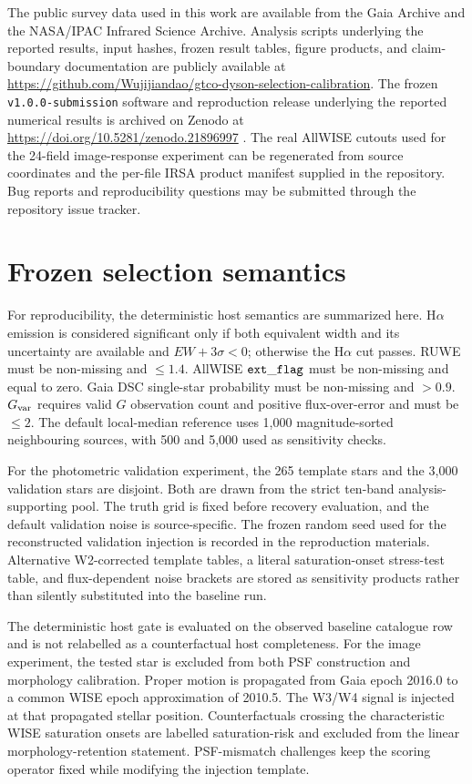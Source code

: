 \documentclass[fleqn,usenatbib]{mnras}
\begin{document}
The public survey data used in this work are available from the Gaia Archive and the NASA/IPAC Infrared Science Archive. Analysis scripts underlying the reported results, input hashes, frozen result tables, figure products, and claim-boundary documentation are publicly available at \url{https://github.com/Wujijiandao/gtco-dyson-selection-calibration}. The frozen \texttt{v1.0.0-submission} software and reproduction release underlying the reported numerical results is archived on Zenodo at \url{https://doi.org/10.5281/zenodo.21896997} \citep{Zhang2026GTCO}. The real AllWISE cutouts used for the 24-field image-response experiment can be regenerated from source coordinates and the per-file IRSA product manifest supplied in the repository. Bug reports and reproducibility questions may be submitted through the repository issue tracker.




\appendix

\section{Frozen selection semantics}
\label{app:semantics}

For reproducibility, the deterministic host semantics are summarized here. H$\alpha$ emission is considered significant only if both equivalent width and its uncertainty are available and $EW+3\sigma<0$; otherwise the H$\alpha$ cut passes. RUWE must be non-missing and $\le1.4$. AllWISE ${\tt ext\_flag}$ must be non-missing and equal to zero. Gaia DSC single-star probability must be non-missing and $>0.9$. $G_{\rm var}$ requires valid $G$ observation count and positive flux-over-error and must be $\le2$. The default local-median reference uses 1,000 magnitude-sorted neighbouring sources, with 500 and 5,000 used as sensitivity checks.

For the photometric validation experiment, the 265 template stars and the 3,000 validation stars are disjoint. Both are drawn from the strict ten-band analysis-supporting pool. The truth grid is fixed before recovery evaluation, and the default validation noise is source-specific. The frozen random seed used for the reconstructed validation injection is recorded in the reproduction materials. Alternative W2-corrected template tables, a literal saturation-onset stress-test table, and flux-dependent noise brackets are stored as sensitivity products rather than silently substituted into the baseline run.

The deterministic host gate is evaluated on the observed baseline catalogue row and is not relabelled as a counterfactual host completeness. For the image experiment, the tested star is excluded from both PSF construction and morphology calibration. Proper motion is propagated from Gaia epoch 2016.0 to a common WISE epoch approximation of 2010.5. The W3/W4 signal is injected at that propagated stellar position. Counterfactuals crossing the characteristic WISE saturation onsets are labelled saturation-risk and excluded from the linear morphology-retention statement. PSF-mismatch challenges keep the scoring operator fixed while modifying the injection template.

\label{lastpage}
\end{document}
